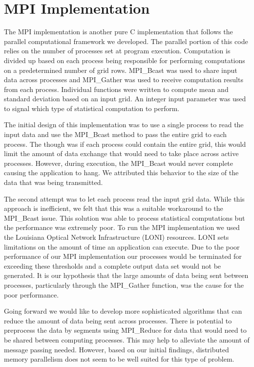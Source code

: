 \section{MPI Implementation}
The MPI implementation is another pure C implementation that follows the parallel computational framework we developed. 
The parallel portion of this code relies on the number of processes set at program execution. 
Computation is divided up based on each process being responsible for performing computations on a predetermined number of grid rows. 
MPI\_Bcast was used to share input data across processes and MPI\_Gather was used to receive computation results from each process. 
Individual functions were written to compute mean and standard deviation based on an input grid. 
An integer input parameter was used to signal which type of statistical computation to perform.

\par
The initial design of this implementation was to use a single process to read the input data and use the MPI\_Bcast method to pass the entire grid to each process. 
The though was if each process could contain the entire grid, this would limit the amount of data exchange that would need to take place across active processes. 
However, during execution, the MPI\_Bcast would never complete causing the application to hang. 
We attributed this behavior to the size of the data that was being transmitted.

\par
The second attempt was to let each process read the input grid data. 
While this approach is inefficient, we felt that this was a suitable workaround to the MPI\_Bcast issue. 
This solution was able to process statistical computations but the performance was extremely poor. 
To run the MPI implementation we used the Louisiana Optical Network Infrastructure (LONI) resources. 
LONI sets limitations on the amount of time an application can execute. 
Due to the poor performance of our MPI implementation our processes would be terminated for exceeding these thresholds and a complete output data set would not be generated. 
It is our hypothesis that the large amounts of data being sent between processes, particularly through the MPI\_Gather function, was the cause for the poor performance.

\par
Going forward we would like to develop more sophisticated algorithms that can reduce the amount of data being sent across processes. 
There is potential to preprocess the data by segments using MPI\_Reduce for data that would need to be shared between computing processes. 
This may help to alleviate the amount of message passing needed. 
However, based on our initial findings, distributed memory parallelism does not seem to be well suited for this type of problem.
